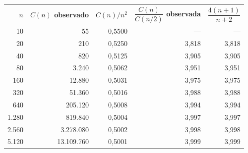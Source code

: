 \begin{tabular}{rrrrr}
\toprule
$n$ & $C(n)$ observado & $C(n)/n^2$ & $\dfrac{C(n)}{C(n/2)}$ observada & $\dfrac{4(n+1)}{n+2}$ \\
\midrule
10 & 55 & 0,5500 & --- & --- \\
20 & 210 & 0,5250 & 3,818 & 3,818 \\
40 & 820 & 0,5125 & 3,905 & 3,905 \\
80 & 3.240 & 0,5062 & 3,951 & 3,951 \\
160 & 12.880 & 0,5031 & 3,975 & 3,975 \\
320 & 51.360 & 0,5016 & 3,988 & 3,988 \\
640 & 205.120 & 0,5008 & 3,994 & 3,994 \\
1.280 & 819.840 & 0,5004 & 3,997 & 3,997 \\
2.560 & 3.278.080 & 0,5002 & 3,998 & 3,998 \\
5.120 & 13.109.760 & 0,5001 & 3,999 & 3,999 \\
\bottomrule
\end{tabular}
